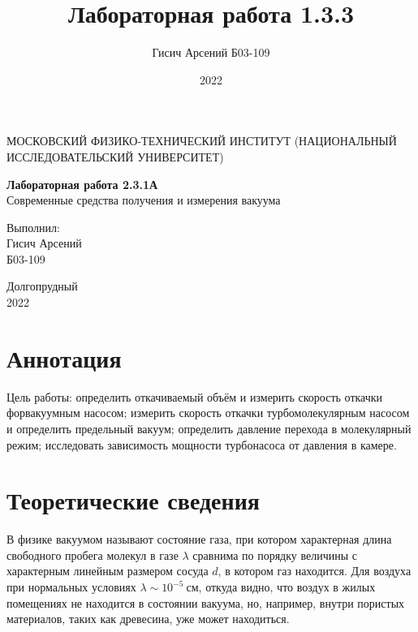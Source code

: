 \documentclass[a4paper, 12pt]{article}
\title{Лабораторная работа 1.3.3}
\author{Гисич Арсений Б03-109}
\date{2022}
\begin{document}
	\begin{center}
		{\large МОСКОВСКИЙ ФИЗИКО-ТЕХНИЧЕСКИЙ ИНСТИТУТ (НАЦИОНАЛЬНЫЙ ИССЛЕДОВАТЕЛЬСКИЙ УНИВЕРСИТЕТ)}
	\end{center}
	\vspace{5 cm}
	{\Large
		\begin{center}
			{\bf Лабораторная работа 2.3.1А}\\[0.2 cm]
			Современные средства получения и измерения вакуума
		\end{center}
	}
	\vspace{4 cm}
	\begin{flushright}
		{\Large Выполнил: \\
			\vspace{0.2 cm}
			Гисич Арсений \\
			\vspace{0.2 cm}
			Б03-109 \\}
	\end{flushright}
	\vspace{9 cm}
	\begin{center}
		Долгопрудный\\[0.1 cm]
		2022
	\end{center}
\thispagestyle{empty}

\section{Аннотация}

\par Цель работы: определить откачиваемый объём и измерить скорость откачки форвакуумным насосом; измерить скорость откачки турбомолекулярным насосом и определить предельный вакуум; определить давление перехода в молекулярный режим; исследовать зависимость мощности турбонасоса от давления в камере.

\section{Теоретические сведения}

В физике вакуумом называют состояние газа, при котором характерная длина свободного пробега молекул в газе $\lambda$ сравнима по порядку
величины с характерным линейным размером сосуда $d$, в котором газ
находится. Для воздуха при нормальных условиях $\lambda \sim 10^{-5}~см$, откуда
видно, что воздух в жилых помещениях не находится в состоянии вакуума, но, например, внутри пористых материалов, таких как древесина, уже
может находиться.
\end{document}
